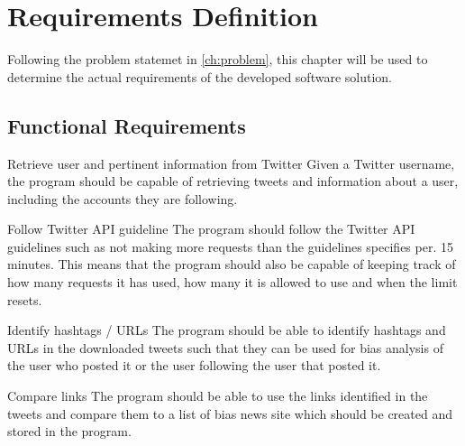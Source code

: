 \chapter{Requirements Definition}\label{cha:req}
Following the problem statemet in \autoref{ch:problem}, this chapter will be
used to determine the actual requirements of the developed software solution.


\section{Functional Requirements}

\begin{requirement}{Retrieve user and pertinent information from Twitter}
Given a Twitter username, the program should be capable of retrieving
tweets and information about a user, including the accounts they are following.
\end{requirement}

\begin{requirement}{Follow Twitter \ac{API} guideline}
The program should follow the Twitter \ac{API} guidelines such as not making
more requests than the guidelines specifies per. 15 minutes. This means that the
program should also be capable of keeping track of how many requests it has
used, how many it is allowed to use and when the limit resets.
\end{requirement}

\begin{requirement}{Identify hashtags / \acsp{URL}}
The program should be able to identify hashtags and \acp{URL} in the downloaded
tweets such that they can be used for bias analysis of the user who posted it or
the user following the user that posted it.
\end{requirement}

\begin{requirement}{Compare links}
The program should be able to use the links identified in the tweets and compare
them to a list of bias news site which should be created and stored in the
program. 
\end{requirement}

